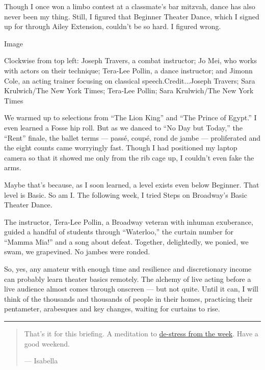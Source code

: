 Though I once won a limbo contest at a classmate's bar mitzvah, dance
has also never been my thing. Still, I figured that Beginner Theater
Dance, which I signed up for through Ailey Extension, couldn't be so
hard. I figured wrong.

Image

Clockwise from top left: Joseph Travers, a combat instructor; Jo Mei,
who works with actors on their technique; Tera-Lee Pollin, a dance
instructor; and Jimonn Cole, an acting trainer focusing on classical
speech.Credit...Joseph Travers; Sara Krulwich/The New York Times;
Tera-Lee Pollin; Sara Krulwich/The New York Times

We warmed up to selections from ``The Lion King'' and ``The Prince of
Egypt.'' I even learned a Fosse hip roll. But as we danced to ``No Day
but Today,'' the ``Rent'' finale, the ballet terms --- passé, coupé,
rond de jambe --- proliferated and the eight counts came worryingly
fast. Though I had positioned my laptop camera so that it showed me only
from the rib cage up, I couldn't even fake the arms.

Maybe that's because, as I soon learned, a level exists even below
Beginner. That level is Basic. So am I. The following week, I tried
Steps on Broadway's Basic Theater Dance.

The instructor, Tera-Lee Pollin, a Broadway veteran with inhuman
exuberance, guided a handful of students through ``Waterloo,'' the
curtain number for ``Mamma Mia!'' and a song about defeat. Together,
delightedly, we ponied, we swam, we grapevined. No jambes were ronded.

So, yes, any amateur with enough time and resilience and discretionary
income can probably learn theater basics remotely. The alchemy of live
acting before a live audience almost comes through onscreen --- but not
quite. Until it can, I will think of the thousands and thousands of
people in their homes, practicing their pentameter, arabesques and key
changes, waiting for curtains to rise.

\begin{center}\rule{0.5\linewidth}{\linethickness}\end{center}

\begin{quote}
That's it for this briefing. A meditation to
\href{https://www.youtube.com/watch?v=qA9DrMM41Fk}{de-stress from the
week}. Have a good weekend.

--- Isabella
\end{quote}

